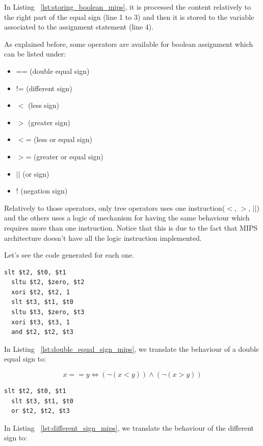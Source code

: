 \documentclass[
  oneside,
  11pt, a4paper,
  footinclude=true,
  headinclude=true,
  cleardoublepage=empty
]{scrbook}
\begin{document}
In Listing ~\ref{lst:storing_boolean_mips}, it is processed the content relatively to the right part of the equal sign (line 1 to 3) and then it is stored to the variable associated to the assignment statement (line 4).

As explained before, some operators are available for boolean assignment which can be listed under:

\begin{itemize}
\item == (double equal sign)
\item != (different sign)
\item $<$ (less sign)
\item $>$ (greater sign)
\item $<$= (less or equal sign)
\item $>$= (greater or equal sign)
\item $||$ (or sign)
\item ! (negation sign)
\end{itemize}

Relatively to those operators, only tree operators uses one instruction($<$, $>$, $||$) and the others uses a logic of mechanism for having the same behaviour which requires more than one instruction. Notice that this is due to the fact that MIPS architecture doesn't have all the logic instruction implemented.

Let's see the code generated for each one.

\begin{lstlisting}[caption={Code generated for double equal sign in MIPS},label={lst:double_equal_sign_mips}]
  slt $t2, $t0, $t1	
  sltu $t2, $zero, $t2	
  xori $t2, $t2, 1	
  slt $t3, $t1, $t0	
  sltu $t3, $zero, $t3
  xori $t3, $t3, 1	
  and $t2, $t2, $t3	
\end{lstlisting}

In Listing ~\ref{lst:double_equal_sign_mips}, we translate the behaviour of a double equal sign to:

\begin{equation}
  x == y \iff (\lnot (x < y)) \land (\lnot (x > y))
\end{equation}

\begin{lstlisting}[caption={Code generated for different sign in MIPS},label={lst:different_sign_mips}]
  slt $t2, $t0, $t1	
  slt $t3, $t1, $t0	
  or $t2, $t2, $t3	
\end{lstlisting}

In Listing ~\ref{lst:different_sign_mips}, we translate the behaviour of the different sign to:
\end{document}
